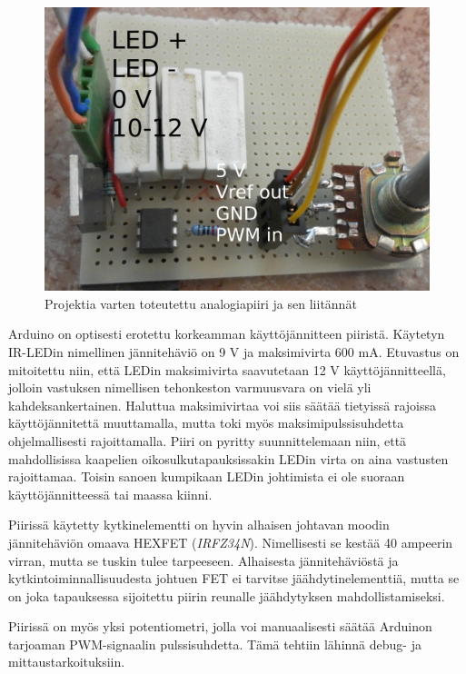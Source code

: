 \documentclass[finnish,12pt]{article}
\begin{document}
\begin{figure}[htcb]
 \begin{center}
 \includegraphics[scale=0.25]{kuvat/piiri_liittimet.jpg}
 \caption{Projektia varten toteutettu analogiapiiri ja sen liitännät}
 \label{fig:piiri}
 \end{center}
\end{figure}

Arduino on optisesti erotettu korkeamman käyttöjännitteen piiristä. Käytetyn IR-LEDin nimellinen jännitehäviö on 9 V ja maksimivirta 600 mA. Etuvastus on mitoitettu niin, että LEDin maksimivirta saavutetaan 12 V käyttöjännitteellä, jolloin vastuksen nimellisen tehonkeston varmuusvara on vielä yli kahdeksankertainen. Haluttua maksimivirtaa voi siis säätää tietyissä rajoissa käyttöjännitettä muuttamalla, mutta toki myös maksimipulssisuhdetta ohjelmallisesti rajoittamalla. Piiri on pyritty suunnittelemaan niin, että mahdollisissa kaapelien oikosulkutapauksissakin LEDin virta on aina vastusten rajoittamaa. Toisin sanoen kumpikaan LEDin johtimista ei ole suoraan käyttöjännitteessä tai maassa kiinni.

Piirissä käytetty kytkinelementti on hyvin alhaisen johtavan moodin jännitehäviön omaava HEXFET (\textit{IRFZ34N}). Nimellisesti se kestää 40 ampeerin virran, mutta se tuskin tulee tarpeeseen. Alhaisesta jännitehäviöstä ja kytkintoiminnallisuudesta johtuen FET ei tarvitse jäähdytinelementtiä, mutta se on joka tapauksessa sijoitettu piirin reunalle jäähdytyksen mahdollistamiseksi.

Piirissä on myös yksi potentiometri, jolla voi manuaalisesti säätää Arduinon tarjoaman PWM-signaalin pulssisuhdetta. Tämä tehtiin lähinnä debug- ja mittaustarkoituksiin.
\end{document}
